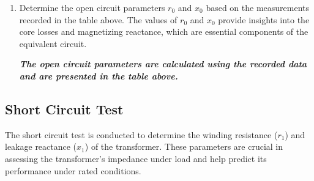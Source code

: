 \documentclass[12pt,a4paper]{report}
\begin{document}
\begin{enumerate}
    \item Determine the open circuit parameters \( r_0 \) and \( x_0 \) based on the measurements recorded in the table above. The values of \( r_0 \) and \( x_0 \) provide insights into the core losses and magnetizing reactance, which are essential components of the equivalent circuit.
    
    \textbf{\textit{The open circuit parameters are calculated using the recorded data and are presented in the table above.}}
\end{enumerate}

\subsection{Short Circuit Test}
The short circuit test is conducted to determine the winding resistance (\( r_1 \)) and leakage reactance (\( x_1 \)) of the transformer. These parameters are crucial in assessing the transformer’s impedance under load and help predict its performance under rated conditions.
\end{document}
